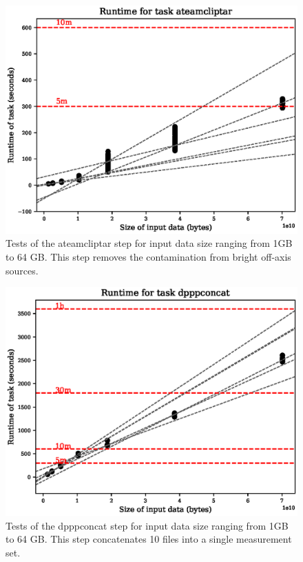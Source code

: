 \documentclass[preprint,5p]{elsarticle}
\begin{document}
\begin{figure}
    \includegraphics[width=0.95\linewidth]{figures/ateamcliptar_size.eps}
      \caption{Tests of the ateamcliptar step for input data size ranging from 1GB to 64 GB. This step removes the contamination from bright off-axis sources. }
	\label{fig:ateamcliptar}
\end{figure}

\begin{figure}
    \includegraphics[width=0.95\linewidth]{figures/dpppconcat_size.eps}
      \caption{Tests of the dpppconcat step for input data size ranging from 1GB to 64 GB. This step concatenates 10 files into a single measurement set.}
	\label{fig:dpppconcat_size}
\end{figure}
\end{document}
